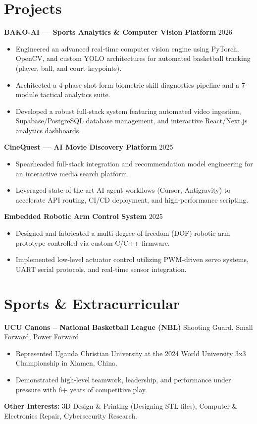 \documentclass[a4paper,10pt]{article}
\begin{document}
\section{Projects}
\textbf{BAKO-AI — Sports Analytics \& Computer Vision Platform} \hfill 2026
\begin{itemize}[leftmargin=*]
    \item Engineered an advanced real-time computer vision engine using PyTorch, OpenCV, and custom YOLO architectures for automated basketball tracking (player, ball, and court keypoints).
    \item Architected a 4-phase shot-form biometric skill diagnostics pipeline and a 7-module tactical analytics suite.
    \item Developed a robust full-stack system featuring automated video ingestion, Supabase/PostgreSQL database management, and interactive React/Next.js analytics dashboards.
\end{itemize}

\textbf{CineQuest — AI Movie Discovery Platform} \hfill 2025
\begin{itemize}[leftmargin=*]
    \item Spearheaded full-stack integration and recommendation model engineering for an interactive media search platform.
    \item Leveraged state-of-the-art AI agent workflows (Cursor, Antigravity) to accelerate API routing, CI/CD deployment, and high-performance scripting.
\end{itemize}

\textbf{Embedded Robotic Arm Control System} \hfill 2025
\begin{itemize}[leftmargin=*]
    \item Designed and fabricated a multi-degree-of-freedom (DOF) robotic arm prototype controlled via custom C/C++ firmware.
    \item Implemented low-level actuator control utilizing PWM-driven servo systems, UART serial protocols, and real-time sensor integration.
\end{itemize}

\section{Sports \& Extracurricular}
\textbf{UCU Canons – National Basketball League (NBL)} \hfill Shooting Guard, Small Forward, Power Forward
\begin{itemize}[leftmargin=*]
    \item Represented Uganda Christian University at the 2024 World University 3x3 Championship in Xiamen, China.
    \item Demonstrated high-level teamwork, leadership, and performance under pressure with 6+ years of competitive play.
\end{itemize}

\textbf{Other Interests:} 3D Design \& Printing (Designing STL files), Computer \& Electronics Repair, Cybersecurity Research.
\end{document}

